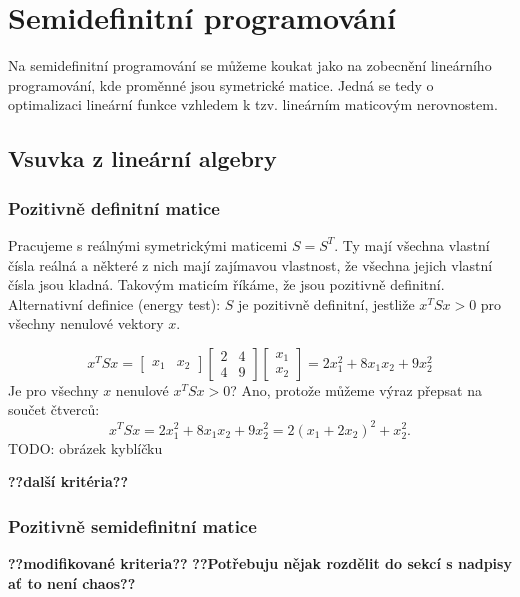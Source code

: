\chapter{Semidefinitní programování}

Na semidefinitní programování se můžeme koukat jako na zobecnění lineárního programování, kde proměnné jsou symetrické matice. Jedná se tedy o optimalizaci lineární funkce vzhledem k tzv. lineárním maticovým nerovnostem.

\section{Vsuvka z lineární algebry}

\subsection*{Pozitivně definitní matice}

Pracujeme s reálnými symetrickými maticemi $S = S^T$. Ty mají všechna vlastní čísla reálná a některé z nich mají zajímavou vlastnost, že všechna jejich vlastní čísla jsou kladná. Takovým maticím říkáme, že jsou pozitivně definitní. Alternativní definice (energy test): $S$ je pozitivně definitní, jestliže $x^TSx > 0$ pro všechny nenulové vektory $x$.

\begin{pr}
$$
    x^T S x = 
    \begin{bmatrix}
        x_1 & x_2
    \end{bmatrix}
    \begin{bmatrix}
        2 & 4 \\
        4 & 9
    \end{bmatrix}
    \begin{bmatrix}
        x_1 \\
        x_2
    \end{bmatrix} =
    2 x_1^2 + 8 x_1 x_2 + 9 x_2^2
$$
Je pro všechny $x$ nenulové $x^TSx > 0$? Ano, protože můžeme výraz přepsat na součet čtverců:
$$
    x^TSx = 2 x_1^2 + 8 x_1 x_2 + 9 x_2^2 = 2 (x_1 + 2 x_2)^2 + x_2^2.
$$
TODO: obrázek kyblíčku
\end{pr}

\textbf{??další kritéria??}

\subsection*{Pozitivně semidefinitní matice}

\textbf{??modifikované kriteria??}
\textbf{??Potřebuju nějak rozdělit do sekcí s nadpisy ať to není chaos??}

